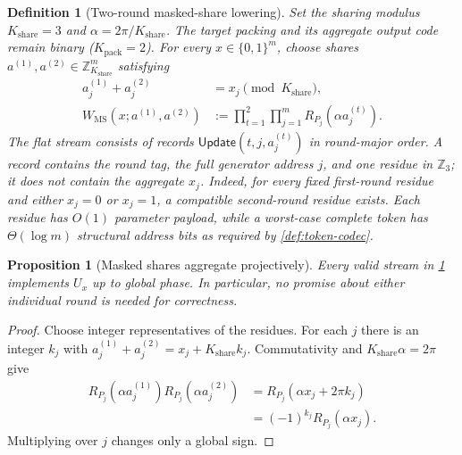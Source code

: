 \documentclass[aps,prx,reprint,floatfix,superscriptaddress]{revtex4-2}
\newtheorem{definition}{Definition}
\newtheorem{proposition}{Proposition}
\begin{document}
\begin{definition}[Two-round masked-share lowering]
\label{def:masked-share}
Set the sharing modulus $K_{\mathrm{share}}=3$ and
$\alpha=2\pi/K_{\mathrm{share}}$.  The target packing and its aggregate
output code remain binary ($K_{\mathrm{pack}}=2$).  For every
$x\in\{0,1\}^m$, choose shares
$a^{(1)},a^{(2)}\in\mathbb Z_{K_{\mathrm{share}}}^m$ satisfying
\begin{equation}\label{eq:masked-share-W}
\begin{aligned}
 a_j^{(1)}+a_j^{(2)}&=x_j\pmod {K_{\mathrm{share}}},\\
 W_{\mathrm{MS}}(x;a^{(1)},a^{(2)})
 &:=\prod_{t=1}^{2}\prod_{j=1}^{m}
 R_{P_j}\!\left(\alpha a_j^{(t)}\right).
\end{aligned}
\end{equation}
The flat stream consists of records
$\mathsf{Update}(t,j,a_j^{(t)})$ in round-major order.  A record contains
the round tag, the full generator address $j$, and one residue in
$\mathbb Z_3$; it does not contain the aggregate $x_j$.  Indeed, for every
fixed first-round residue and either $x_j=0$ or $x_j=1$, a compatible
second-round residue exists.  Each residue has $O(1)$ parameter payload,
while a worst-case complete token has $\Theta(\log m)$ structural address
bits as required by \cref{def:token-codec}.
\end{definition}

\begin{proposition}[Masked shares aggregate projectively]
\label{prop:masked-aggregates}
Every valid stream in \cref{def:masked-share} implements $U_x$ up to global
phase.  In particular, no promise about either individual round is needed
for correctness.
\end{proposition}

\begin{proof}
Choose integer representatives of the residues.  For each $j$ there is an
integer $k_j$ with
$a_j^{(1)}+a_j^{(2)}=x_j+K_{\mathrm{share}}k_j$.  Commutativity and
$K_{\mathrm{share}}\alpha=2\pi$ give
\begin{equation*}
\begin{aligned}
 R_{P_j}(\alpha a_j^{(1)})R_{P_j}(\alpha a_j^{(2)})
 &=R_{P_j}(\alpha x_j+2\pi k_j)\\
 &=(-1)^{k_j}R_{P_j}(\alpha x_j).
\end{aligned}
\end{equation*}
Multiplying over $j$ changes only a global sign.
\end{proof}
\end{document}
